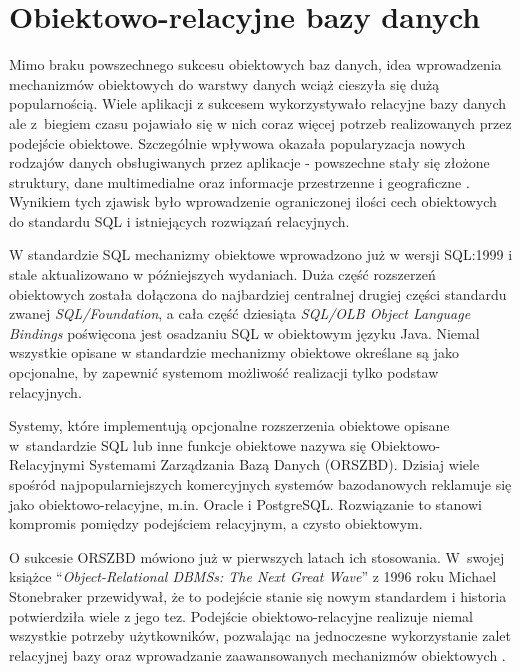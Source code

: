 \documentclass[a4paper,twoside,12pt]{book}
\begin{document}
\section{Obiektowo-relacyjne bazy danych}

Mimo braku powszechnego sukcesu obiektowych baz danych, idea wprowadzenia mechanizmów obiektowych do warstwy danych wciąż cieszyła się dużą popularnością. Wiele aplikacji z sukcesem wykorzystywało relacyjne bazy danych ale z~biegiem czasu pojawiało się w nich coraz więcej potrzeb realizowanych przez podejście obiektowe. Szczególnie wpływowa okazała popularyzacja nowych rodzajów danych obsługiwanych przez aplikacje - powszechne stały się złożone struktury, dane multimedialne oraz informacje przestrzenne i geograficzne \cite{bib:integrating-xml-technology-with-or-databases}. Wynikiem tych zjawisk było wprowadzenie ograniczonej ilości cech obiektowych do standardu SQL i istniejących rozwiązań relacyjnych.

W standardzie SQL mechanizmy obiektowe wprowadzono już w wersji SQL:1999 i stale aktualizowano w późniejszych wydaniach. Duża część rozszerzeń obiektowych została dołączona do najbardziej centralnej drugiej części standardu zwanej \textit{SQL/Foundation}, a cała część dziesiąta \textit{SQL/OLB Object Language Bindings} poświęcona jest osadzaniu SQL w obiektowym języku Java. Niemal wszystkie opisane w standardzie mechanizmy obiektowe określane są jako opcjonalne, by zapewnić systemom możliwość realizacji tylko podstaw relacyjnych.

Systemy, które implementują opcjonalne rozszerzenia obiektowe opisane w~standardzie SQL lub inne funkcje obiektowe nazywa się Obiektowo{-}Relacyjnymi Systemami Zarządzania Bazą Danych (ORSZBD). Dzisiaj wiele spośród najpopularniejszych komercyjnych systemów bazodanowych reklamuje się jako obiektowo-relacyjne, m.in. Oracle i PostgreSQL. Rozwiązanie to stanowi kompromis pomiędzy podejściem relacyjnym, a czysto obiektowym.

O sukcesie ORSZBD mówiono już w pierwszych latach ich stosowania. W~swojej książce ``\textit{Object-Relational DBMSs: The Next Great Wave}'' z 1996 roku Michael Stonebraker przewidywał, że to podejście stanie się nowym standardem i historia potwierdziła wiele z jego tez. Podejście obiektowo-relacyjne realizuje niemal wszystkie potrzeby użytkowników, pozwalając na jednoczesne wykorzystanie zalet relacyjnej bazy oraz wprowadzanie zaawansowanych mechanizmów obiektowych \cite{bib:ordbms-tracking-the-next-great-wave,bib:ordbms-the-next-great-wave}.
\end{document}
